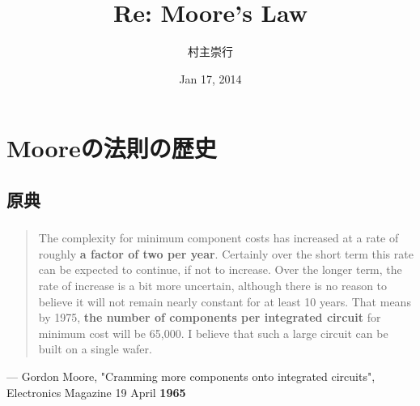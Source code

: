 \documentclass{beamer}  %
\theoremstyle{example}
\begin{document}
\title[Beamer]{Re: Moore's Law} 
\author[Nushio]{村主崇行}            %
\date{Jan 17, 2014}

\begin{frame}                  %
\titlepage                     %
\end{frame}

\begin{frame}                  %
\tableofcontents
\end{frame}

\section{Mooreの法則の歴史}          
\subsection{原典}
\begin{frame}\frametitle{\insertsubsection}
\begin{quote}
The complexity for minimum component costs has increased at a rate of roughly {\bf a factor of two per year}. Certainly over the short term this rate can be expected to continue, if not to increase. Over the longer term, the rate of increase is a bit more uncertain, although there is no reason to believe it will not remain nearly constant for at least 10 years. That means by 1975, {\bf the number of components per integrated circuit} for minimum cost will be 65,000. I believe that such a large circuit can be built on a single wafer.
\end{quote}
\begin{flushright}
--- Gordon Moore, "Cramming more components onto integrated circuits", Electronics Magazine 19 April {\bf 1965}
\end{flushright}

\end{frame}
\end{document}
